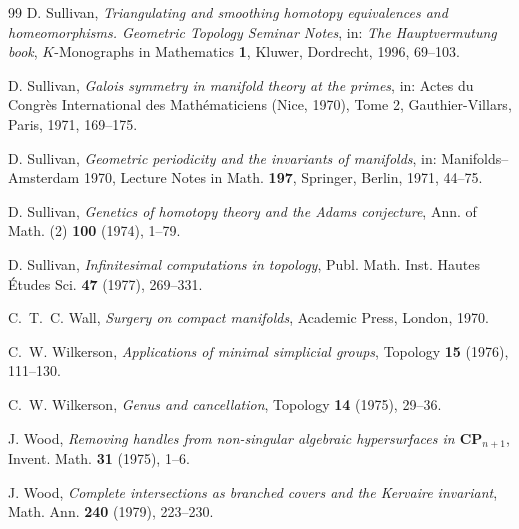 \documentclass[11pt]{amsart}
\theoremstyle{plain}
\theoremstyle{definition}
\numberwithin{equation}{section}
\begin{document}
\begin{thebibliography}{99}
D. Sullivan, \emph{Triangulating and smoothing homotopy equivalences and homeomorphisms. Geometric Topology Seminar Notes}, in: \emph{The Hauptvermutung book}, $K$-Monographs in Mathematics \textbf{1}, Kluwer, Dordrecht, 1996, 69--103.

D. Sullivan, \emph{Galois symmetry in manifold theory at the primes}, in: Actes du Congr\`es International des Math\'ematiciens (Nice, 1970), Tome 2, Gauthier-Villars, Paris, 1971, 169--175.

D. Sullivan, \emph{Geometric periodicity and the invariants of manifolds}, in: Manifolds--Amsterdam 1970, Lecture Notes in Math. \textbf{197}, Springer, Berlin, 1971, 44--75.

D. Sullivan, \emph{Genetics of homotopy theory and the Adams conjecture}, Ann. of Math. (2) \textbf{100} (1974), 1--79.

D. Sullivan, \emph{Infinitesimal computations in topology}, Publ. Math. Inst. Hautes \'Etudes Sci. \textbf{47} (1977), 269--331.

C.~T.~C. Wall, \emph{Surgery on compact manifolds}, Academic Press, London, 1970.

C.~W. Wilkerson, \emph{Applications of minimal simplicial groups}, Topology \textbf{15} (1976), 111--130.

C.~W. Wilkerson, \emph{Genus and cancellation}, Topology \textbf{14} (1975), 29--36.

J. Wood, \emph{Removing handles from non-singular algebraic hypersurfaces in $\mathbf{CP}_{n+1}$}, Invent. Math. \textbf{31} (1975), 1--6.

J. Wood, \emph{Complete intersections as branched covers and the Kervaire invariant}, Math. Ann. \textbf{240} (1979), 223--230.

\end{thebibliography}
\end{document}
